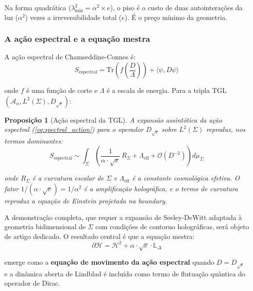 \documentclass[12pt,a4paper,twoside]{article}
\newtheorem{proposition}[theorem]{Proposição}
\newcommand{\alphaii}{\alpha^{2}}
\newcommand{\boundary}{\textit{boundary}}
\begin{document}
Na forma quadrática ($\lambda_{\min}^2 = \alpha^2 \times e$), o piso é o custo de duas autointerações da luz ($\alpha^2$) vezes a irreversibilidade total ($e$). É o preço mínimo da geometria.

\subsubsection{A ação espectral e a equação mestra}

A ação espectral de Chamseddine-Connes \cite{Chamseddine1997} é:
\begin{equation}
S_{\text{espectral}} = \text{Tr}\!\left(f\!\left(\frac{D}{\Lambda}\right)\right) + \langle \psi, D\psi \rangle
\label{eq:spectral_action}
\end{equation}

\noindent onde $f$ é uma função de corte e $\Lambda$ é a escala de energia. Para a tripla TGL $(\mathcal{A}_\alpha, L^2(\Sigma), D_{\sqrt{e}})$:

\begin{proposition}[Ação espectral da TGL]
\label{prop:acao_espectral}
A expansão assintótica da ação espectral (\ref{eq:spectral_action}) para o operador $D_{\sqrt{e}}$ sobre $L^2(\Sigma)$ reproduz, nos termos dominantes:
\begin{equation}
S_{\text{espectral}} \sim \int_\Sigma \left(\frac{1}{\alpha \cdot \sqrt{e}}\, R_\Sigma + \Lambda_{\text{eff}} + \mathcal{O}(D^{-2})\right) d\mu_\Sigma
\end{equation}

\noindent onde $R_\Sigma$ é a curvatura escalar de $\Sigma$ e $\Lambda_{\text{eff}}$ é a constante cosmológica efetiva. O fator $1/(\alpha \cdot \sqrt{e}) = 1/\alphaii$ é a amplificação holográfica, e o termo de curvatura reproduz a equação de Einstein projetada na \boundary{}.
\end{proposition}

A demonstração completa, que requer a expansão de Seeley-DeWitt adaptada à geometria bidimensional de $\Sigma$ com condições de contorno holográficas, será objeto de artigo dedicado. O resultado central é que a equação mestra:
\begin{equation}
\partial\mathcal{H} = \mathcal{H}^2 + \alpha \cdot \sqrt{e} \cdot \mathbb{L}_\Delta
\end{equation}

\noindent emerge como a \textbf{equação de movimento da ação espectral} quando $D = D_{\sqrt{e}}$ e a dinâmica aberta de Lindblad é incluída como termo de flutuação quântica do operador de Dirac.
\end{document}
